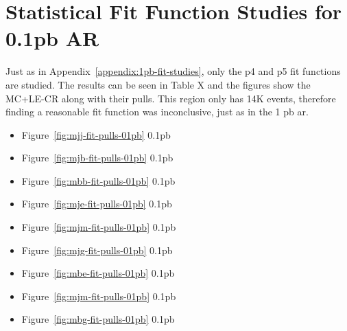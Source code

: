 \newpage

\vspace*{0.5in}

\section{Statistical Fit Function Studies for 0.1pb AR}
\label{appendix:01pb-fit-studies}
\setcounter{equation}{0}

Just as in Appendix~\ref{appendix:1pb-fit-studies}, only the p4 and p5 fit functions are studied. The results can be seen in Table X and the figures show the MC+LE-CR along with 
their pulls. This region only has 14K events, therefore finding a reasonable fit function was inconclusive, just as in the 1 pb \gls{ar}.

\begin{multicols}{3}
    \begin{itemize}
    \item Figure~\ref{fig:mjj-fit-pulls-01pb} 0.1pb \mjj
    \item Figure~\ref{fig:mjb-fit-pulls-01pb} 0.1pb \mjb
    \item Figure~\ref{fig:mbb-fit-pulls-01pb} 0.1pb \mbb
    \item Figure~\ref{fig:mje-fit-pulls-01pb} 0.1pb \mje
    \item Figure~\ref{fig:mjm-fit-pulls-01pb} 0.1pb \mjmu
    \item Figure~\ref{fig:mjg-fit-pulls-01pb} 0.1pb \mjph
    \item Figure~\ref{fig:mbe-fit-pulls-01pb} 0.1pb \mbe
    \item Figure~\ref{fig:mjm-fit-pulls-01pb} 0.1pb \mbmu
    \item Figure~\ref{fig:mbg-fit-pulls-01pb} 0.1pb \mbph
    \end{itemize}
 \end{multicols}

 \newpage

 

 \newpage

